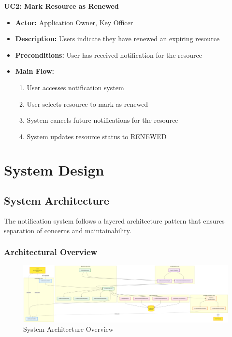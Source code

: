 \noindent
\textbf{UC2: Mark Resource as Renewed}
\begin{itemize}
    \item \textbf{Actor:} Application Owner, Key Officer
    \item \textbf{Description:} Users indicate they have renewed an expiring resource
    \item \textbf{Preconditions:} User has received notification for the resource
    \item \textbf{Main Flow:}
        \begin{enumerate}
            \item User accesses notification system
            \item User selects resource to mark as renewed
            \item System cancels future notifications for the resource
            \item System updates resource status to RENEWED
        \end{enumerate}
\end{itemize}

\section{System Design}

\subsection{System Architecture}

The notification system follows a layered architecture pattern that ensures separation of concerns and maintainability.

\subsubsection{Architectural Overview}

\begin{figure}[H]
    \centering
    \includegraphics[width=1\textwidth]{images/system_architecture.png}
    \caption{System Architecture Overview}
    \label{fig:system_architecture}
\end{figure}

